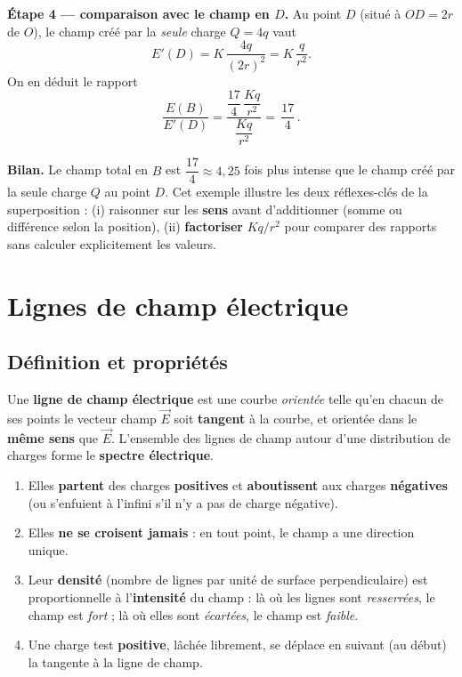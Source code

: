 \documentclass[11pt,a4paper]{article}
\newcommand{\vc}[1]{\vec{#1}}
\begin{document}
\begin{exemple}
\textbf{Étape 4 — comparaison avec le champ en $D$.} Au point $D$ (situé à $OD = 2r$ de $O$), le
champ créé par la \emph{seule} charge $Q = 4q$ vaut
\[ E'(D) = K\,\frac{4q}{(2r)^{2}} = K\,\frac{q}{r^{2}}. \]
On en déduit le rapport
\[ \frac{E(B)}{E'(D)} = \frac{\dfrac{17}{4}\,\dfrac{Kq}{r^{2}}}{\dfrac{Kq}{r^{2}}} = \boxed{\,\dfrac{17}{4}\,}. \]

\textbf{Bilan.} Le champ total en $B$ est $\dfrac{17}{4}\approx 4{,}25$ fois plus intense que le
champ créé par la seule charge $Q$ au point $D$. Cet exemple illustre les deux réflexes-clés de la
superposition : (i) raisonner sur les \textbf{sens} avant d'additionner (somme ou différence selon
la position), (ii) \textbf{factoriser} $Kq/r^{2}$ pour comparer des rapports sans calculer
explicitement les valeurs.
\end{exemple}

\section{Lignes de champ électrique}

\subsection{Définition et propriétés}

\begin{definition}
Une \textbf{ligne de champ électrique} est une courbe \emph{orientée} telle qu'en chacun de ses
points le vecteur champ $\vc{E}$ soit \textbf{tangent} à la courbe, et orientée dans le
\textbf{même sens} que $\vc{E}$. L'ensemble des lignes de champ autour d'une distribution de charges
forme le \textbf{spectre électrique}.
\end{definition}

\begin{theoreme}
\leavevmode
\begin{enumerate}[leftmargin=1.8em,topsep=2pt,itemsep=2pt]
  \item Elles \textbf{partent} des charges \textbf{positives} et \textbf{aboutissent} aux charges
        \textbf{négatives} (ou s'enfuient à l'infini s'il n'y a pas de charge négative).
  \item Elles \textbf{ne se croisent jamais} : en tout point, le champ a une direction unique.
  \item Leur \textbf{densité} (nombre de lignes par unité de surface perpendiculaire) est
        proportionnelle à l'\textbf{intensité} du champ : là où les lignes sont \emph{resserrées},
        le champ est \emph{fort} ; là où elles sont \emph{écartées}, le champ est \emph{faible}.
  \item Une charge test \textbf{positive}, lâchée librement, se déplace en suivant (au début) la
        tangente à la ligne de champ.
\end{enumerate}
\end{theoreme}
\end{document}
